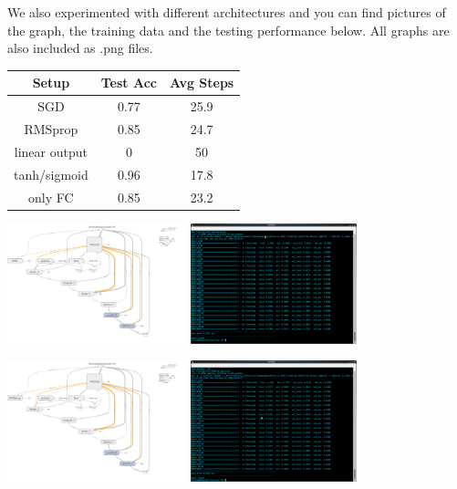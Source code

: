 \documentclass[a4paper]{article}
\begin{document}
We also experimented with different architectures and you can find pictures of the graph, the training data and the testing performance below. All graphs are also included as .png files.\\
\begin{center}
\begin{tabular}{|c|c|c|}
\hline 
 Setup& Test Acc & Avg Steps \\ 
\hline 
SGD & 0.77 & 25.9 \\ 
\hline 
RMSprop & 0.85 & 24.7 \\ 
\hline 
linear output & 0 & 50 \\ 
\hline 
tanh/sigmoid & 0.96 & 17.8 \\ 
\hline 
only FC & 0.85 & 23.2 \\ 
\hline 
\end{tabular}
\end{center}


\begin{minipage}[t]{0.45\textwidth}
\includegraphics[height=3.5cm,width=\textwidth]{sgd_graph.png}
\includegraphics[height=3.5cm,width=\textwidth]{sgd_training.png}
\end{minipage}
\hfill
\begin{minipage}[t]{0.45\textwidth}
\includegraphics[height=3.5cm,width=\textwidth]{rmsprop_graph.png}
\includegraphics[height=3.5cm,width=\textwidth]{rms_training.png}
\end{minipage}
\end{document}
